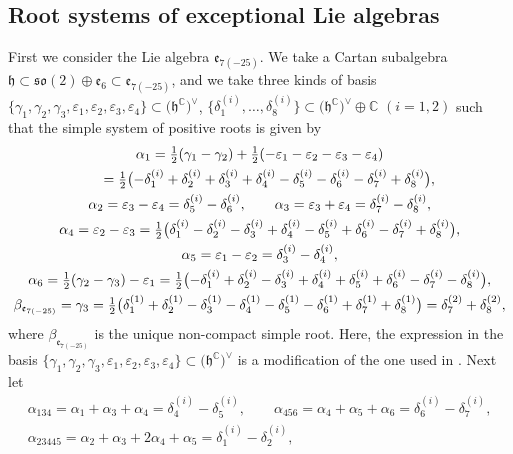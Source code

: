 \documentclass[pdftex]{sigma}
\numberwithin{equation}{section}
\newcommand{\BC}{\mathbb{C}}
\newcommand{\fh}{\mathfrak{h}}
\newcommand{\ve}{\varepsilon}
\begin{document}
\subsection{Root systems of exceptional Lie algebras}
First we consider the Lie algebra $\mathfrak{e}_{7(-25)}$. We take a Cartan subalgebra
$\fh\subset\mathfrak{so}(2)\oplus\mathfrak{e}_6\subset\mathfrak{e}_{7(-25)}$, and we take three kinds of basis
$\{\gamma_1,\gamma_2,\gamma_3,\ve_1,\ve_2,\ve_3,\ve_4\}\subset\big(\fh^\BC\big)^\vee$,
$\big\{\delta_1^{(i)},\ldots,\delta_8^{(i)}\big\}\subset\big(\fh^\BC\big)^\vee\oplus\BC$ $(i=1,2)$
such that the simple system of positive roots is given by
\begin{gather*}
\alpha_1 =\tfrac12 (\gamma_1-\gamma_2)+\tfrac{1}{2}(-\ve_1-\ve_2-\ve_3-\ve_4) \\
\hphantom{\alpha_1}{} =\tfrac{1}{2}\big({-}\delta_1^{(i)}+\delta_2^{(i)}+\delta_3^{(i)}+\delta_4^{(i)}-\delta_5^{(i)}-\delta_6^{(i)}-\delta_7^{(i)}+\delta_8^{(i)}\big),\\
\alpha_2 =\ve_3-\ve_4 =\delta_5^{(i)}-\delta_6^{(i)},\qquad
\alpha_3 =\ve_3+\ve_4 =\delta_7^{(i)}-\delta_8^{(i)},\\
\alpha_4 =\ve_2-\ve_3
 =\tfrac{1}{2}\big(\delta_1^{(i)}-\delta_2^{(i)}-\delta_3^{(i)}+\delta_4^{(i)}-\delta_5^{(i)}+\delta_6^{(i)}-\delta_7^{(i)}+\delta_8^{(i)}\big),\\
\alpha_5 =\ve_1-\ve_2 =\delta_3^{(i)}-\delta_4^{(i)},\\
\alpha_6 =\tfrac12 (\gamma_2-\gamma_3)-\ve_1
 =\tfrac{1}{2}\big({-}\delta_1^{(i)}+\delta_2^{(i)}-\delta_3^{(i)}+\delta_4^{(i)}+\delta_5^{(i)}+\delta_6^{(i)}-\delta_7^{(i)}-\delta_8^{(i)}\big),\\
\beta_{\mathfrak{e}_{7(-25)}} =\gamma_3
 =\tfrac{1}{2}\big(\delta_1^{(1)}+\delta_2^{(1)}-\delta_3^{(1)}-\delta_4^{(1)}-\delta_5^{(1)}-\delta_6^{(1)}+\delta_7^{(1)}+\delta_8^{(1)}\big)
 =\delta_7^{(2)}+\delta_8^{(2)},
\end{gather*}
where $\beta_{\mathfrak{e}_{7(-25)}}$ is the unique non-compact simple root. Here, the expression in the basis $\{\gamma_1,\gamma_2,\gamma_3,\allowbreak\ve_1,\ve_2,\ve_3,\ve_4\}\subset\big(\fh^\BC\big)^\vee$
is a modification of the one used in \cite{Y2}. Next let
\begin{gather*}
\alpha_{134} =\alpha_1+\alpha_3+\alpha_4 =\delta_4^{(i)}-\delta_5^{(i)},\qquad
\alpha_{456} =\alpha_4+\alpha_5+\alpha_6 =\delta_6^{(i)}-\delta_7^{(i)},\\
\alpha_{23445} =\alpha_2+\alpha_3+2\alpha_4+\alpha_5 =\delta_1^{(i)}-\delta_2^{(i)},
\end{gather*}
\end{document}
